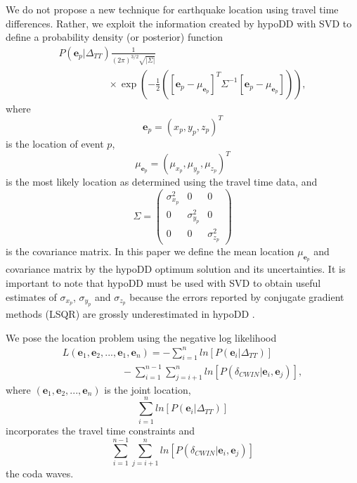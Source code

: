 \documentclass[extra, onecolumn, doublespacing]{gji}
\begin{document}
We do not propose a new technique for earthquake location using
travel time differences. Rather, we exploit the information created
by hypoDD with SVD to define a probability density (or posterior)
function
\begin{equation}
\label{eq-multi-var-Gauss-tt}
\begin{array}{l}
P(\mathbf{e}_p|\Delta_{TT})
\frac{1}{(2\pi)^{3/2}\sqrt{|\Sigma|}} \\
\hspace{5em} \times \exp
\left({-\frac{1}{2}\left([\mathbf{e}_p-\mu_{\mathbf{e}_p}]^T
\Sigma^{-1} [\mathbf{e}_p-\mu_{\mathbf{e}_p}]\right)} \right),
\end{array}
\end{equation}
where
\begin{equation}
\mathbf{e}_p = (x_p,y_p,z_p)^T
\end{equation}
is the location of event $p$,
\begin{equation}
\mu_{\mathbf{e}_p} = (\mu_{x_p}, \mu_{y_p},\mu_{z_p})^T
\end{equation}
is the most likely location as determined using the travel time
data, and
\begin{equation}
\label{eq:Sigma-expression}
\Sigma = \left( \begin{array}{ccc} \sigma_{x_p}^2 & 0 & 0\\
0 &  \sigma_{y_p}^2 & 0 \\
0 & 0 & \sigma_{z_p}^2  \end{array} \right)
\end{equation}
is the covariance matrix. In this paper we define the mean location
$\mu_{\mathbf{e}_p}$ and covariance matrix by the hypoDD optimum
solution and its uncertainties. It is important to note that hypoDD
must be used with SVD to obtain useful estimates of $\sigma_{x_p}$,
$\sigma_{y_p}$ and $\sigma_{z_p}$ because the errors reported by
conjugate gradient methods (LSQR) are grossly underestimated in
hypoDD \citep{dr_Waldhauser01a}.

We pose the location problem using the negative log likelihood
\begin{equation}
\label{eq-Lstar-tt-cwi}
\begin{array}{l}
 L(\mathbf{e}_1, \mathbf{e}_2, ...,
\mathbf{e}_1, \mathbf{e}_n) = - \sum_{i=1}^n
ln\left[P(\mathbf{e}_i|\Delta_{TT})\right] \\
\hspace{6em}  - \sum_{i=1}^{n-1}
\sum_{j=i+1}^n
ln\left[P(\delta_{CWIN}|\mathbf{e}_i,\mathbf{e}_j)\right],
\end{array}
\end{equation}
where $(\mathbf{e}_1, \mathbf{e}_2, ..., \mathbf{e}_n)$ is the joint
location,
\begin{equation}
\label{eq-ttcomponent} \sum_{i=1}^n
ln\left[P(\mathbf{e}_i|\Delta_{TT})\right]
\end{equation}
incorporates the travel time constraints and
\begin{equation}
\label{eq-codacomponent} \sum_{i=1}^{n-1} \sum_{j=i+1}^n
ln\left[P(\delta_{CWIN}|\mathbf{e}_i,\mathbf{e}_j)\right]
\end{equation}
 the coda waves.
\end{document}

